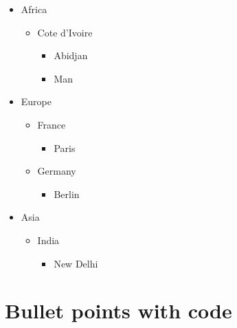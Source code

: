 \documentclass[10pt]{report}
\begin{document}
\begin{itemize}
\item Africa
\begin{itemize}
\item Cote d'Ivoire

\begin{itemize}
\item Abidjan

\item Man

\end{itemize}
\end{itemize}
\item Europe

\begin{itemize}
\item France

\begin{itemize}
\item Paris

\end{itemize}
\item Germany

\begin{itemize}
\item Berlin

\end{itemize}
\end{itemize}
\item Asia

\begin{itemize}
\item India

\begin{itemize}
\item New Delhi

\end{itemize}
\end{itemize}
\end{itemize}


\section{Bullet points with code}
\end{document}
